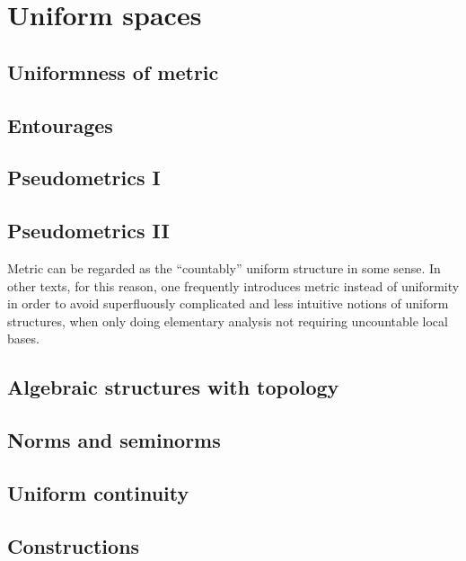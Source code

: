 \documentclass{../crs}
\begin{document}
\section{Uniform spaces}
\subsection{Uniformness of metric}
\subsection{Entourages}
\subsection{Pseudometrics I}
\subsection{Pseudometrics II}





Metric can be regarded as the ``countably'' uniform structure in some sense. 
In other texts, for this reason, one frequently introduces metric instead of uniformity in order to avoid superfluously complicated and less intuitive notions of uniform structures, when only doing elementary analysis not requiring uncountable local bases.
\subsection{Algebraic structures with topology}
\subsection{Norms and seminorms}
\subsection{Uniform continuity}
\subsection{Constructions}
\end{document}
